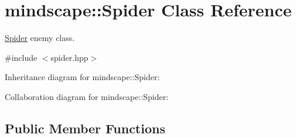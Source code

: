 \hypertarget{classmindscape_1_1_spider}{}\section{mindscape\+:\+:Spider Class Reference}
\label{classmindscape_1_1_spider}


\hyperlink{classmindscape_1_1_spider}{Spider} enemy class.  




{\ttfamily \#include $<$spider.\+hpp$>$}



Inheritance diagram for mindscape\+:\+:Spider\+:


Collaboration diagram for mindscape\+:\+:Spider\+:
\subsection*{Public Member Functions}
